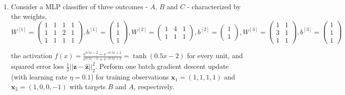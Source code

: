\documentclass[12pt]{article}
\begin{document}
\begin{enumerate}[leftmargin=\labelsep]
    \item Consider a MLP classifier of three outcomes - $A$, $B$ and $C$ - characterized by the weights,
    \begin{equation}
        W^{[1]}=\begin{pmatrix}
            1 & 1 & 1 & 1 \\
            1 & 1 & 2 & 1 \\
            1 & 1 & 1 & 1
        \end{pmatrix}, b^{[1]} = \begin{pmatrix}
            1 \\
            1 \\
            1
        \end{pmatrix}, W^{[2]} = \begin{pmatrix}
            1 & 4 & 1 \\
            1 & 1 & 1
        \end{pmatrix}, b^{[2]} = \begin{pmatrix}
            1 \\
            1
        \end{pmatrix}, W^{[3]} = \begin{pmatrix}
            1 & 1 \\
            3 & 1 \\
            1 & 1
        \end{pmatrix}, b^{[3]} = \begin{pmatrix}
            1 \\
            1 \\
            1
        \end{pmatrix}
    \end{equation}

    the activation $f(x) = \frac{e^{0.5x-2}-e^{-0.5x+2}}{e^{0.5x-2}+e^{-0.5x+2}} = \tanh(0.5x-2)$ for every unit, and squared error loss $\frac{1}{2}||\mathbf{z}-\hat{\mathbf{z}}||^2_2$. Perform one batch gradient descent update (with learning rate $\eta = 0.1$) for training observations $\mathbf{x}_1 = (1, 1, 1, 1)$ and $\mathbf{x}_2 = (1, 0, 0, -1)$ with targets $B$ and $A$, respectively.
    

\end{enumerate}
\end{document}

